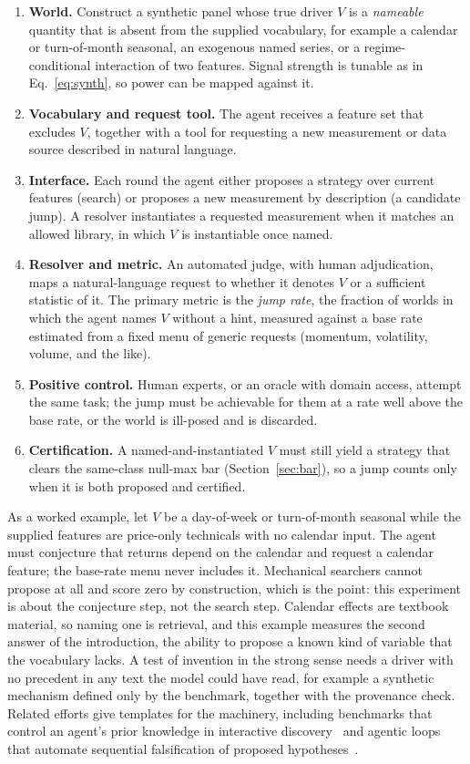\documentclass[11pt]{article}
\begin{document}
\begin{enumerate}[leftmargin=1.6em]
\item \textbf{World.} Construct a synthetic panel whose true driver $V$ is a \emph{nameable} quantity
that is absent from the supplied vocabulary, for example a calendar or turn-of-month seasonal, an
exogenous named series, or a regime-conditional interaction of two features. Signal strength is tunable
as in Eq.~\eqref{eq:synth}, so power can be mapped against it.
\item \textbf{Vocabulary and request tool.} The agent receives a feature set that excludes $V$, together
with a tool for requesting a new measurement or data source described in natural language.
\item \textbf{Interface.} Each round the agent either proposes a strategy over current features (search)
or proposes a new measurement by description (a candidate jump). A resolver instantiates a requested
measurement when it matches an allowed library, in which $V$ is instantiable once named.
\item \textbf{Resolver and metric.} An automated judge, with human adjudication, maps a natural-language
request to whether it denotes $V$ or a sufficient statistic of it. The primary metric is the
\emph{jump rate}, the fraction of worlds in which the agent names $V$ without a hint, measured against a
base rate estimated from a fixed menu of generic requests (momentum, volatility, volume, and the like).
\item \textbf{Positive control.} Human experts, or an oracle with domain access, attempt the same task;
the jump must be achievable for them at a rate well above the base rate, or the world is ill-posed and
is discarded.
\item \textbf{Certification.} A named-and-instantiated $V$ must still yield a strategy that clears the
same-class null-max bar (Section~\ref{sec:bar}), so a jump counts only when it is both proposed and
certified.
\end{enumerate}

As a worked example, let $V$ be a day-of-week or turn-of-month seasonal while the supplied features are
price-only technicals with no calendar input. The agent must conjecture that returns depend on the
calendar and request a calendar feature; the base-rate menu never includes it. Mechanical searchers
cannot propose at all and score zero by construction, which is the point: this experiment is about the
conjecture step, not the search step. Calendar effects are textbook material, so naming one is retrieval,
and this example measures the second answer of the introduction, the ability to propose a known kind of
variable that the vocabulary lacks. A test of invention in the strong sense needs a driver with no
precedent in any text the model could have read, for example a synthetic mechanism defined only by the
benchmark, together with the provenance check. Related efforts give templates for the machinery, including
benchmarks that control an agent's prior knowledge in interactive discovery~\cite{physgym} and agentic
loops that automate sequential falsification of proposed hypotheses~\cite{falsify}.
\end{document}
